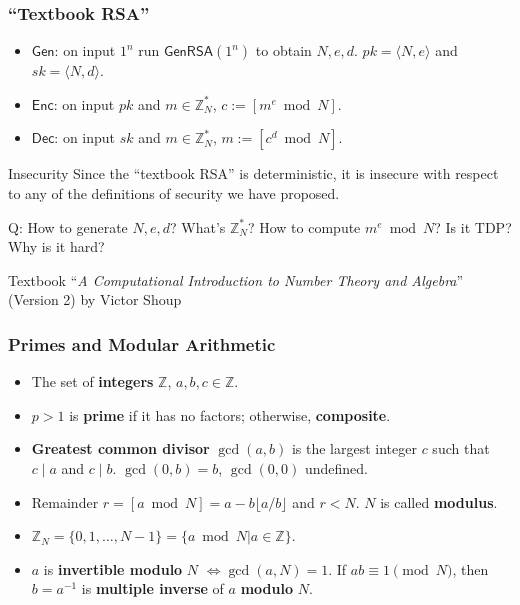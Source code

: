 \begin{frame}\frametitle{``Textbook RSA''}
\begin{construction}
\begin{itemize}
\item $\mathsf{Gen}$: on input $1^n$ run $\mathsf{GenRSA}(1^n)$ to obtain $N,e,d$. $pk = \langle N,e \rangle$ and $sk = \langle N,d \rangle$.
\item $\mathsf{Enc}$: on input $pk$ and $m \in \mathbb{Z}^*_N$, $c:= [m^e \bmod N]$.
\item $\mathsf{Dec}$: on input $sk$ and $m \in \mathbb{Z}^*_N$, $m:= [c^d \bmod N]$.
\end{itemize}
\end{construction}
\begin{alertblock}{Insecurity}
Since the ``textbook RSA'' is deterministic, it is insecure with respect to any of the definitions of security we have proposed. 
\end{alertblock}
\alert{Q: How to generate $N,e,d$? What's $\mathbb{Z}^*_N$? How to compute $m^e \bmod N$? Is it TDP? Why is it hard?}
\begin{block}{Textbook}
``\emph{A Computational Introduction to Number Theory and Algebra}''
(Version 2) by Victor Shoup
\end{block}
\end{frame}
\begin{frame}\frametitle{Primes and Modular Arithmetic}
\begin{itemize}
\item The set of \textbf{integers} $\mathbb{Z}$, $a,b,c \in \mathbb{Z}$.
\item $p > 1$ is \textbf{prime} if it has no factors; otherwise, \textbf{composite}.
\item \textbf{Greatest common divisor} $\gcd(a,b)$ is the largest integer $c$ such that $c\mid a$ and $c\mid b$. $\gcd(0,b)=b$, $\gcd(0,0)$ undefined.
\item Remainder $r= [a\bmod N] = a - b\lfloor a/b\rfloor $  and $r<N$. $N$ is called \textbf{modulus}.
\item $\mathbb{Z}_N = \{0,1,\dots,N-1\} = \{a \bmod N | a \in \mathbb{Z}\}$.
\item $a$ is \textbf{invertible modulo} $N$ $\iff \gcd(a,N) = 1$. If $ab \equiv 1 \pmod N$, then $b=a^{-1}$ is \textbf{multiple inverse} of $a$ \textbf{modulo} $N$.
\end{itemize}
\end{frame}
